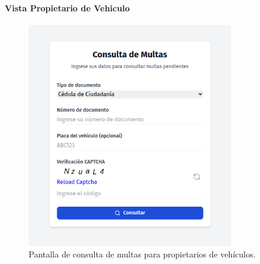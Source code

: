 \paragraph{Vista Propietario de Vehiculo}
\begin{figure}[htbp]
    \centering
    \includegraphics[width=0.8\textwidth]{Images/UI5.png}
    \caption{Pantalla de consulta de multas para propietarios de vehículos.}
    \label{fig:consulta_multas_propietario}
\end{figure} 